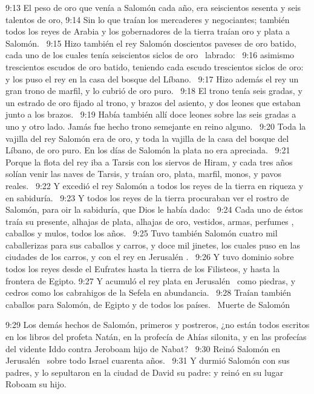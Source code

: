 									9:13 El peso de oro que venía a Salomón cada año, era seiscientos sesenta y seis talentos de oro, 
									9:14 Sin lo que traían los mercaderes y negociantes; también todos los reyes de Arabia y los gobernadores de la tierra traían oro y plata a Salomón.  
									9:15 Hizo también el rey Salomón doscientos paveses de oro batido, cada uno de los cuales tenía seiscientos siclos de oro  labrado:  
									9:16 asimismo trescientos escudos de oro batido, teniendo cada escudo trescientos siclos de oro:  y los puso el rey en la casa del bosque del Líbano.  
									9:17 Hizo además el rey un gran trono de marfil, y lo cubrió de oro puro.  
									9:18 El trono tenía seis gradas, y un estrado de oro fijado al trono, y brazos del asiento, y dos leones que estaban junto a los brazos.  
									9:19 Había también allí doce leones sobre las seis gradas a uno y otro lado. Jamás fue hecho trono semejante en reino alguno.  
									9:20 Toda la vajilla del rey Salomón era de oro, y toda la vajilla de la casa del bosque del Líbano, de oro puro. En los días de Salomón la plata no era apreciada.  
									9:21 Porque la flota del rey iba a Tarsis con los siervos de Hiram, y cada tres años solían venir las naves de Tarsis, y traían oro, plata, marfil, monos, y pavos reales.  
									9:22 Y excedió el rey Salomón a todos los reyes de la tierra en riqueza y en sabiduría.  
									9:23 Y todos los reyes de la tierra procuraban ver el rostro de Salomón, para oir la sabiduría, que Dios le había dado:  
									9:24 Cada uno de éstos traía su presente, alhajas de plata, alhajas de oro, vestidos, armas, perfumes , caballos y mulos, todos los años.  
									9:25 Tuvo también Salomón cuatro mil caballerizas para sus caballos y carros, y doce mil jinetes, los cuales puso en las ciudades de los carros, y con el rey en Jerusalén .  
									9:26 Y tuvo dominio sobre todos los reyes desde el Eufrates hasta la tierra de los Filisteos, y hasta la frontera de Egipto. 
									9:27 Y acumuló el rey plata en Jerusalén  como piedras, y cedros como los cabrahigos de la Sefela en abundancia.  
									9:28 Traían también caballos para Salomón, de Egipto y de todos los países.  
									Muerte de Salomón  
									
									9:29 Los demás hechos de Salomón, primeros y postreros, ¿no están todos escritos en los libros del profeta Natán, en la profecía de Ahías silonita, y en las profecías del vidente Iddo contra Jeroboam hijo de Nabat?  
									9:30 Reinó Salomón en Jerusalén  sobre todo Israel cuarenta años.  
									9:31 Y durmió Salomón con sus padres, y lo sepultaron en la ciudad de David su padre: y reinó en su lugar Roboam su hijo.  

